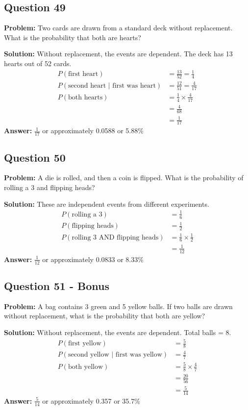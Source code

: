 \documentclass[12pt]{article}
\begin{document}
\subsection*{Question 49}
\textbf{Problem:} Two cards are drawn from a standard deck without replacement. What is the probability that both are hearts?

\textbf{Solution:} Without replacement, the events are dependent. The deck has 13 hearts out of 52 cards.
\begin{align*}
P(\text{first heart}) &= \frac{13}{52} = \frac{1}{4} \\
P(\text{second heart | first was heart}) &= \frac{12}{51} = \frac{4}{17} \\
P(\text{both hearts}) &= \frac{1}{4} \times \frac{4}{17} \\
&= \frac{4}{68} \\
&= \frac{1}{17}
\end{align*}
\textbf{Answer:} $\frac{1}{17}$ or approximately 0.0588 or 5.88\%

\subsection*{Question 50}
\textbf{Problem:} A die is rolled, and then a coin is flipped. What is the probability of rolling a 3 and flipping heads?

\textbf{Solution:} These are independent events from different experiments.
\begin{align*}
P(\text{rolling a 3}) &= \frac{1}{6} \\
P(\text{flipping heads}) &= \frac{1}{2} \\
P(\text{rolling 3 AND flipping heads}) &= \frac{1}{6} \times \frac{1}{2} \\
&= \frac{1}{12}
\end{align*}
\textbf{Answer:} $\frac{1}{12}$ or approximately 0.0833 or 8.33\%

\subsection*{Question 51 - Bonus}
\textbf{Problem:} A bag contains 3 green and 5 yellow balls. If two balls are drawn without replacement, what is the probability that both are yellow?

\textbf{Solution:} Without replacement, the events are dependent. Total balls = 8.
\begin{align*}
P(\text{first yellow}) &= \frac{5}{8} \\
P(\text{second yellow | first was yellow}) &= \frac{4}{7} \\
P(\text{both yellow}) &= \frac{5}{8} \times \frac{4}{7} \\
&= \frac{20}{56} \\
&= \frac{5}{14}
\end{align*}
\textbf{Answer:} $\frac{5}{14}$ or approximately 0.357 or 35.7\%
\end{document}

